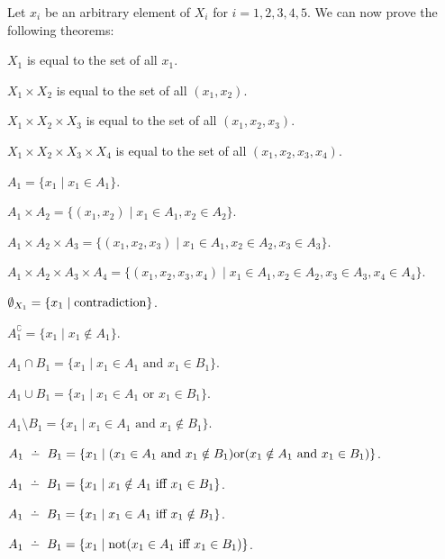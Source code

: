 \documentclass{article}
\begin{document}
Let $x_{i}$ be an arbitrary element of $X_{i}$ for $i=1,2,3,4,5$.
We can now prove the following theorems:
\begin{thm}
\item\label{domain1:18} $X_{1}$ is equal to the set of all $x_{1}$.
\item\label{domain1:19} $X_{1}\times X_{2}$ is equal to the set of all $(x_{1},x_{2})$.
\item\label{domain1:20} $X_{1}\times X_{2}\times X_{3}$ is equal to the set of all $(x_{1},x_{2},x_{3})$.
\item\label{domain1:21} $X_{1}\times X_{2}\times X_{3}\times X_{4}$ is equal to the set of all $(x_{1},x_{2},x_{3},x_{4})$. 
\item\label{domain1:22} $A_{1}=\{x_{1}\mid x_{1}\in A_{1}\}$.
\item\label{domain1:23} $A_{1}\times A_{2}=\{(x_{1},x_{2})\mid x_{1}\in A_{1},x_{2}\in A_{2}\}$.
\item\label{domain1:24} $A_{1}\times A_{2}\times A_{3}=\{(x_{1},x_{2},x_{3})\mid x_{1}\in A_{1},x_{2}\in A_{2},x_{3}\in A_{3}\}$.
\item\label{domain1:25} $A_{1}\times A_{2}\times A_{3}\times A_{4}=\{(x_{1},x_{2},x_{3},x_{4})\mid x_{1}\in A_{1},x_{2}\in A_{2},x_{3}\in A_{3},x_{4}\in A_{4}\}$.
\item\label{domain1:26} $\emptyset_{X_{1}}=\{x_{1}\mid\operatorname{contradiction}\}$.
\item\label{domain1:27} $A_{1}^{\complement}=\{x_{1}\mid x_{1}\notin A_{1}\}$.
\item\label{domain1:28} $A_{1}\cap B_{1}=\{x_{1}\mid x_{1}\in A_{1}\mbox{ and }x_{1}\in B_{1}\}$.
\item\label{domain1:29} $A_{1}\cup B_{1}=\{x_{1}\mid x_{1}\in A_{1}\mbox{ or }x_{1}\in B_{1}\}$.
\item\label{domain1:30} $A_{1}\setminus B_{1}=\{x_{1}\mid x_{1}\in A_{1}\mbox{ and }x_{1}\notin B_{1}\}$.
\item\label{domain1:31} $A_{1}\symdiff B_{1}=\{x_{1}\mid (x_{1}\in A_{1}\mbox{ and }x_{1}\notin B_{1})\mbox{or}(x_{1}\notin A_{1}\mbox{ and }x_{1}\in B_{1})\}$.
\item\label{domain1:32} $A_{1}\symdiff B_{1}=\{x_{1}\mid x_{1}\notin A_{1}\mbox{ iff }x_{1}\in B_{1}\}$.
\item\label{domain1:33} $A_{1}\symdiff B_{1}=\{x_{1}\mid x_{1}\in A_{1}\mbox{ iff }x_{1}\notin B_{1}\}$.
\item\label{domain1:34} $A_{1}\symdiff B_{1}=\{x_{1}\mid \mbox{not}(x_{1}\in A_{1}\mbox{ iff }x_{1}\in B_{1})\}$.
\end{thm}
\end{document}
